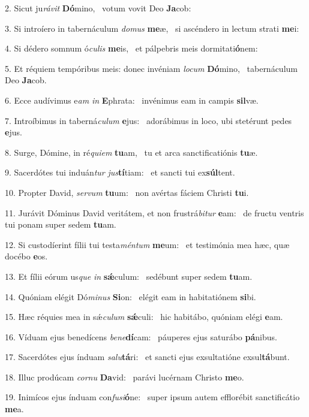 2. Sicut ju\textit{rá}\textit{vit} \textbf{Dó}mino, \ast\  votum vovit Deo \textbf{Ja}cob:\

3. Si introíero in tabernáculum \textit{do}\textit{mus} \textbf{me}æ, \ast\  si ascéndero in lectum strati \textbf{me}i:\

4. Si dédero somnum ó\textit{cu}\textit{lis} \textbf{me}is, \ast\  et pálpebris meis dormitati\textbf{ó}nem:\

5. Et réquiem tempóribus meis: donec invéniam \textit{lo}\textit{cum} \textbf{Dó}mino, \ast\  tabernáculum Deo \textbf{Ja}cob.\

6. Ecce audívimus e\textit{am} \textit{in} \textbf{E}phrata: \ast\  invénimus eam in campis \textbf{sil}væ.\

7. Introíbimus in taberná\textit{cu}\textit{lum} \textbf{e}jus: \ast\  adorábimus in loco, ubi stetérunt pedes \textbf{e}jus.\

8. Surge, Dómine, in ré\textit{qui}\textit{em} \textbf{tu}am, \ast\  tu et arca sanctificatiónis \textbf{tu}æ.\

9. Sacerdótes tui induán\textit{tur} \textit{jus}\textbf{tí}tiam: \ast\  et sancti tui ex\textbf{súl}tent.\

10. Propter David, \textit{ser}\textit{vum} \textbf{tu}um: \ast\  non avértas fáciem Christi \textbf{tu}i.\

11. Jurávit Dóminus David veritátem, et non frustrá\textit{bi}\textit{tur} \textbf{e}am: \ast\  de fructu ventris tui ponam super sedem \textbf{tu}am.\

12. Si custodíerint fílii tui testa\textit{mén}\textit{tum} \textbf{me}um: \ast\  et testimónia mea hæc, quæ docébo \textbf{e}os.\

13. Et fílii eórum us\textit{que} \textit{in} \textbf{sǽ}culum: \ast\  sedébunt super sedem \textbf{tu}am.\

14. Quóniam elégit Dó\textit{mi}\textit{nus} \textbf{Si}on: \ast\  elégit eam in habitatiónem \textbf{si}bi.\

15. Hæc réquies mea in sǽ\textit{cu}\textit{lum} \textbf{sǽ}culi: \ast\  hic habitábo, quóniam elégi \textbf{e}am.\

16. Víduam ejus benedícens \textit{be}\textit{ne}\textbf{dí}cam: \ast\  páuperes ejus saturábo \textbf{pá}nibus.\

17. Sacerdótes ejus índuam \textit{sa}\textit{lu}\textbf{tá}ri: \ast\  et sancti ejus exsultatióne exsul\textbf{tá}bunt.\

18. Illuc prodúcam \textit{cor}\textit{nu} \textbf{Da}vid: \ast\  parávi lucérnam Christo \textbf{me}o.\

19. Inimícos ejus índuam con\textit{fu}\textit{si}\textbf{ó}ne: \ast\  super ipsum autem efflorébit sanctificátio \textbf{me}a.\

